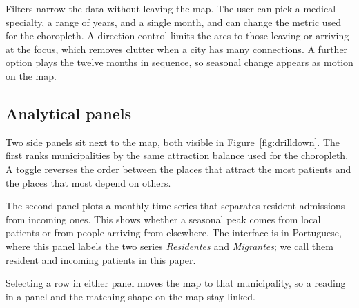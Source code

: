 Filters narrow the data without leaving the map.
The user can pick a medical specialty, a range of years, and a single month, and can change the metric used for the choropleth.
A direction control limits the arcs to those leaving or arriving at the focus, which removes clutter when a city has many connections.
A further option plays the twelve months in sequence, so seasonal change appears as motion on the map.

\subsection{Analytical panels}

Two side panels sit next to the map, both visible in Figure~\ref{fig:drilldown}.
The first ranks municipalities by the same attraction balance used for the choropleth.
A toggle reverses the order between the places that attract the most patients and the places that most depend on others.

The second panel plots a monthly time series that separates resident admissions from incoming ones.
This shows whether a seasonal peak comes from local patients or from people arriving from elsewhere.
The interface is in Portuguese, where this panel labels the two series \emph{Residentes} and \emph{Migrantes}; we call them resident and incoming patients in this paper.

Selecting a row in either panel moves the map to that municipality, so a reading in a panel and the matching shape on the map stay linked.
